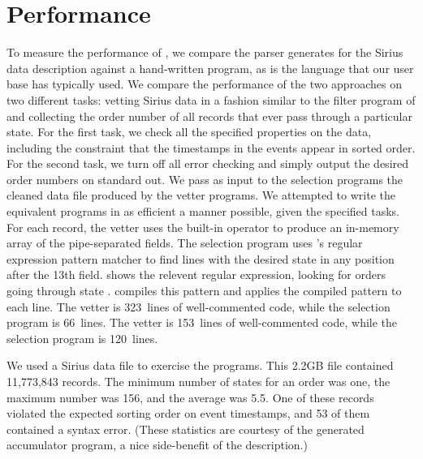 \documentclass{sig-alternate}
\newcommand{\dibbler}{Sirius}
\begin{document}
\section{Performance}
To measure the performance of \pads{}, we compare the parser \pads{} generates for the \dibbler{} data description against a hand-written \perl{} program, as \perl{} is the language that our user base has typically used. We compare the performance of the two approaches on two different tasks: vetting \dibbler{} data in a fashion similar to the filter program of
 and collecting the order number of all records that ever pass through a particular state.  For the first task, we check all the specified properties on the data, including the constraint that the timestamps in the events appear in sorted order.  For the second task, we turn off all error checking and simply output the desired order numbers on standard out.
We pass as input to the selection programs the cleaned data file produced by the vetter programs. 
We attempted to write the equivalent \perl{} programs in as efficient a manner possible, given the specified tasks.  For each record, the \perl{} vetter uses the built-in  operator to produce an in-memory array of the pipe-separated fields.  The \perl{} selection program uses \perl{}'s regular expression pattern matcher to find lines with the desired state in any 
position after the 13th field.   shows the relevent regular expression, looking for orders going through state .
\perl{} compiles this pattern and applies the compiled pattern to each line.  The \perl{} vetter is 323~lines of well-commented \perl{} code, while the selection program is 66~lines.  
The \pads{} vetter is 153~lines of well-commented \C{} code, while the \pads{} selection program is 120~lines. 


We used a \dibbler{} data file to exercise the programs.  This 2.2GB file contained 11,773,843 records.  The minimum number of states for an order was one, the maximum number was 156, and the average was 5.5.  One of these records violated the expected sorting order on event timestamps, and 53 of them contained a syntax error.
(These statistics are courtesy of the generated \pads{} accumulator program, a nice side-benefit of the \pads{} description.)  
\end{document}
